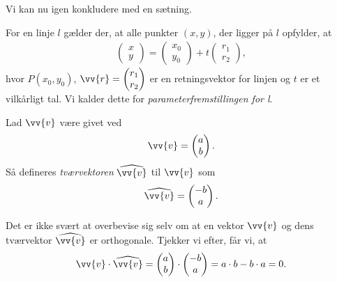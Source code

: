 \newpage
Vi kan nu igen konkludere med en sætning.
\begin{setn}
For en linje $l$ gælder der, at alle punkter $(x,y)$, der ligger på $l$ opfylder, at
\begin{align*}
\begin{pmatrix}
x \\ y
\end{pmatrix}
=
\begin{pmatrix}
x_0 \\ y_0
\end{pmatrix} 
+
t
\begin{pmatrix}
r_1 \\ r_2
\end{pmatrix},
\end{align*} 
hvor $P(x_0,y_0)$, $\vv{r} = \begin{pmatrix}
r_1 \\ r_2
\end{pmatrix}$
er en retningsvektor for linjen og $t$ er et vilkårligt tal. Vi kalder dette for \textit{parameterfremstillingen for l}.
\end{setn}
\begin{defn}[Tværvektor]
	Lad $\vv{v}$ være givet ved
	\begin{align*}
		\vv{v} = 
		\begin{pmatrix}
			a \\ b
		\end{pmatrix}.
	\end{align*}
	Så defineres \textit{tværvektoren} $\widehat{\vv{v}}$ til $\vv{v}$ som 
	\begin{align*}
		\widehat{\vv{v}} = 
		\begin{pmatrix}
			-b \\ a
		\end{pmatrix}.
	\end{align*}
\end{defn}
Det er ikke svært at overbevise sig selv om at en vektor $\vv{v}$ og dens tværvektor $\widehat{\vv{v}}$ er orthogonale. Tjekker vi efter, får vi, at 
\begin{align*}
	\vv{v} \cdot \widehat{\vv{v}} = 
	\begin{pmatrix}
		a \\ b
	\end{pmatrix} \cdot
	\begin{pmatrix}
		-b \\ a
	\end{pmatrix} = 
	a\cdot b - b\cdot a = 0. 
\end{align*}
